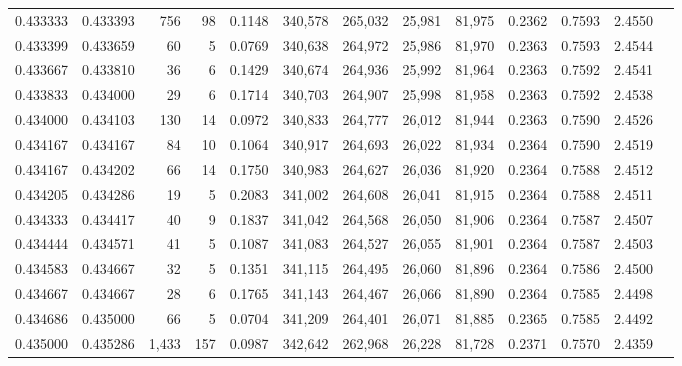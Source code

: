 \begin{tabular}{rrrrrrrrrrrrr}
0.433333 & 0.433393 &   756 &  98 &                                     0.1148 & 340,578 & 265,032 &  25,981 &  81,975 & 0.2362 & 0.7593 & 2.4550 \\
0.433399 & 0.433659 &    60 &   5 &                                     0.0769 & 340,638 & 264,972 &  25,986 &  81,970 & 0.2363 & 0.7593 & 2.4544 \\
0.433667 & 0.433810 &    36 &   6 &                                     0.1429 & 340,674 & 264,936 &  25,992 &  81,964 & 0.2363 & 0.7592 & 2.4541 \\
0.433833 & 0.434000 &    29 &   6 &                                     0.1714 & 340,703 & 264,907 &  25,998 &  81,958 & 0.2363 & 0.7592 & 2.4538 \\
0.434000 & 0.434103 &   130 &  14 &                                     0.0972 & 340,833 & 264,777 &  26,012 &  81,944 & 0.2363 & 0.7590 & 2.4526 \\
0.434167 & 0.434167 &    84 &  10 &                                     0.1064 & 340,917 & 264,693 &  26,022 &  81,934 & 0.2364 & 0.7590 & 2.4519 \\
0.434167 & 0.434202 &    66 &  14 &                                     0.1750 & 340,983 & 264,627 &  26,036 &  81,920 & 0.2364 & 0.7588 & 2.4512 \\
0.434205 & 0.434286 &    19 &   5 &                                     0.2083 & 341,002 & 264,608 &  26,041 &  81,915 & 0.2364 & 0.7588 & 2.4511 \\
0.434333 & 0.434417 &    40 &   9 &                                     0.1837 & 341,042 & 264,568 &  26,050 &  81,906 & 0.2364 & 0.7587 & 2.4507 \\
0.434444 & 0.434571 &    41 &   5 &                                     0.1087 & 341,083 & 264,527 &  26,055 &  81,901 & 0.2364 & 0.7587 & 2.4503 \\
0.434583 & 0.434667 &    32 &   5 &                                     0.1351 & 341,115 & 264,495 &  26,060 &  81,896 & 0.2364 & 0.7586 & 2.4500 \\
0.434667 & 0.434667 &    28 &   6 &                                     0.1765 & 341,143 & 264,467 &  26,066 &  81,890 & 0.2364 & 0.7585 & 2.4498 \\
0.434686 & 0.435000 &    66 &   5 &                                     0.0704 & 341,209 & 264,401 &  26,071 &  81,885 & 0.2365 & 0.7585 & 2.4492 \\
0.435000 & 0.435286 & 1,433 & 157 &                                     0.0987 & 342,642 & 262,968 &  26,228 &  81,728 & 0.2371 & 0.7570 & 2.4359 \\

\end{tabular}
